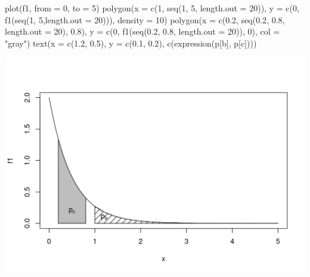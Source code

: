 \documentclass[
  10pt,
  a4paper]{book}
\newenvironment{Shaded}{\begin{snugshade}}{\end{snugshade}}
\newcommand{\AttributeTok}[1]{\textcolor[rgb]{0.77,0.63,0.00}{#1}}
\newcommand{\DecValTok}[1]{\textcolor[rgb]{0.00,0.00,0.81}{#1}}
\newcommand{\FloatTok}[1]{\textcolor[rgb]{0.00,0.00,0.81}{#1}}
\newcommand{\FunctionTok}[1]{\textcolor[rgb]{0.00,0.00,0.00}{#1}}
\newcommand{\NormalTok}[1]{#1}
\newcommand{\StringTok}[1]{\textcolor[rgb]{0.31,0.60,0.02}{#1}}
\begin{document}
\begin{Shaded}
\begin{Highlighting}[]
\FunctionTok{plot}\NormalTok{(f1, }\AttributeTok{from =} \DecValTok{0}\NormalTok{, }\AttributeTok{to =} \DecValTok{5}\NormalTok{)}
\FunctionTok{polygon}\NormalTok{(}\AttributeTok{x =} \FunctionTok{c}\NormalTok{(}\DecValTok{1}\NormalTok{, }\FunctionTok{seq}\NormalTok{(}\DecValTok{1}\NormalTok{, }\DecValTok{5}\NormalTok{, }\AttributeTok{length.out =} \DecValTok{20}\NormalTok{)),}
        \AttributeTok{y =} \FunctionTok{c}\NormalTok{(}\DecValTok{0}\NormalTok{, }\FunctionTok{f1}\NormalTok{(}\FunctionTok{seq}\NormalTok{(}\DecValTok{1}\NormalTok{, }\DecValTok{5}\NormalTok{,}\AttributeTok{length.out =} \DecValTok{20}\NormalTok{))),}
        \AttributeTok{density =} \DecValTok{10}\NormalTok{)}
\FunctionTok{polygon}\NormalTok{(}\AttributeTok{x =} \FunctionTok{c}\NormalTok{(}\FloatTok{0.2}\NormalTok{, }\FunctionTok{seq}\NormalTok{(}\FloatTok{0.2}\NormalTok{, }\FloatTok{0.8}\NormalTok{, }\AttributeTok{length.out =} \DecValTok{20}\NormalTok{), }\FloatTok{0.8}\NormalTok{),}
        \AttributeTok{y =} \FunctionTok{c}\NormalTok{(}\DecValTok{0}\NormalTok{, }\FunctionTok{f1}\NormalTok{(}\FunctionTok{seq}\NormalTok{(}\FloatTok{0.2}\NormalTok{, }\FloatTok{0.8}\NormalTok{, }\AttributeTok{length.out =} \DecValTok{20}\NormalTok{)), }\DecValTok{0}\NormalTok{),}
        \AttributeTok{col =} \StringTok{"gray"}\NormalTok{)}
\FunctionTok{text}\NormalTok{(}\AttributeTok{x =} \FunctionTok{c}\NormalTok{(}\FloatTok{1.2}\NormalTok{, }\FloatTok{0.5}\NormalTok{), }\AttributeTok{y =} \FunctionTok{c}\NormalTok{(}\FloatTok{0.1}\NormalTok{, }\FloatTok{0.2}\NormalTok{),}
     \FunctionTok{c}\NormalTok{(}\FunctionTok{expression}\NormalTok{(p[b], p[c])))}
\end{Highlighting}
\end{Shaded}

\begin{center}\includegraphics{figures/unnamed-chunk-331-1} \end{center}
\end{document}
